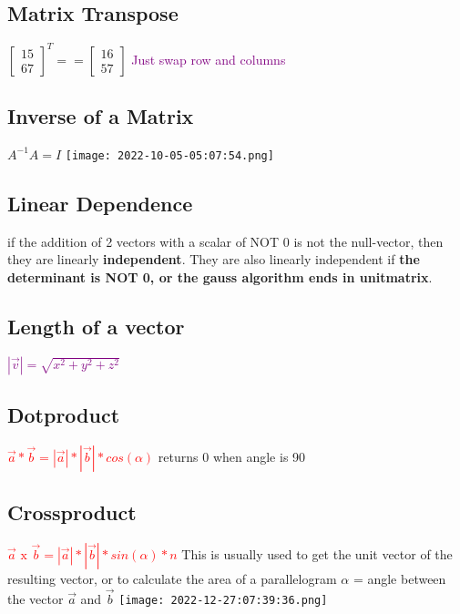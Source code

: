 \documentclass[main.tex,fontsize=12pt,paper=a4,paper=landscape,DIV=calc,]{scrartcl}
\begin{document}
\begin{multicols*}{4}
\subsection{Matrix Transpose}
\(\left[\begin{smallmatrix} 1  5 \\ 6  7 \end{smallmatrix}\right]^T == \left[ \begin{smallmatrix} 1  6 \\ 5  7 \end{smallmatrix}\right]\)\newline
\textcolor{purple}{Just swap row and columns}

\subsection{Inverse of a Matrix}
\(A^{-1}A = I\)\newline
\texttt{[image: 2022-10-05-05:07:54.png]}

\subsection{Linear Dependence}
if the addition of 2 vectors with a scalar of NOT 0 is not the null-vector, then they are linearly \textbf{independent}.\newline
They are also linearly independent if \textbf{the determinant is NOT 0, or the gauss algorithm ends in unitmatrix}.

\subsection{Length of a vector}
\textcolor{purple}{\( |\vec{v}| = \sqrt{x^2 + y^2 + z^2} \)}

\subsection{Dotproduct}
\textbf{\textcolor{red}{\( \vec{a} * \vec{b} = |\vec{a}| * |\vec{b}| * cos(\alpha) \)}}\newline
returns 0 when angle is 90

\subsection{Crossproduct}
\textbf{\textcolor{red}{\( \vec{a} \text{ x } \vec{b} = |\vec{a}| * |\vec{b}| * sin(\alpha) * n\)}}\newline
This is usually used to get the unit vector of the resulting vector, or to\newline
calculate the area of a parallelogram\newline
\(\alpha\) = angle between the vector \(\vec{a}\) and \(\vec{b}\)\newline
\texttt{[image: 2022-12-27:07:39:36.png]}


\end{multicols*}
\end{document}
